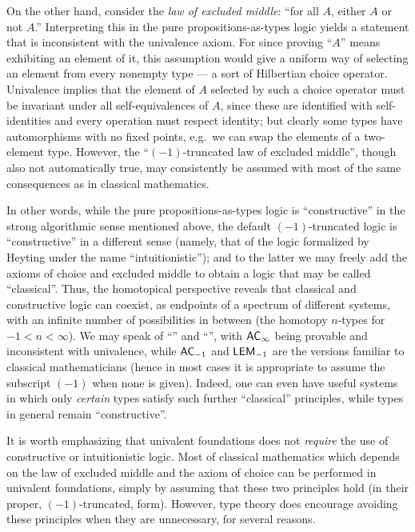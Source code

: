 %
%
On the other hand, consider the \emph{law of excluded middle}: ``for all $A$, either $A$ or not $A$.''
Interpreting this in the pure propositions-as-types logic yields a statement that is inconsistent with the univalence axiom.
For since proving ``$A$'' means exhibiting an element of it, this assumption would give a uniform way of selecting an element from every nonempty type --- a sort of Hilbertian choice operator.
Univalence implies that the element of $A$ selected by such a choice operator must be invariant under all self-equivalences of $A$, since these are identified with self-identities and every operation must respect identity; but clearly some types have automorphisms with no fixed points, e.g.\ we can swap the elements of a two-element type.
%
However, the ``$(-1)$-truncated law of excluded middle'', though also not automatically true, may consistently be assumed with most of the same consequences as in classical mathematics.

In other words, while the pure propositions-as-types logic is ``constructive'' in the strong algorithmic sense mentioned above, the default $(-1)$-truncated logic is ``constructive'' in a different sense (namely, that of the logic formalized by Heyting under the name ``intuitionistic''); and to the latter we may freely add the axioms of choice and excluded middle to obtain a logic that may be called ``classical''.
%
Thus, the homotopical perspective reveals that classical and constructive logic can coexist, as endpoints of a spectrum of different systems, with an infinite number of possibilities in between (the homotopy $n$-types for $-1 < n < \infty$).
We may speak of ``'' and ``'', with $\mathsf{AC}_{\infty}$ being provable and \LEM{\infty} inconsistent with univalence, while $\mathsf{AC}_{-1}$ and $\mathsf{LEM}_{-1}$ are the versions familiar to classical mathematicians (hence in most cases it is appropriate to assume the subscript $(-1)$ when none is given).  Indeed, one can even have useful systems in which only \emph{certain} types satisfy such further ``classical'' principles, while types in general remain ``constructive''.%

It is worth emphasizing that univalent foundations does not \emph{require} the use of constructive or intuitionistic logic. %
Most of classical mathematics which depends on the law of excluded middle and the axiom of choice can be performed in univalent foundations, simply by assuming that these two principles hold (in their proper, $(-1)$-truncated, form).
However, type theory does encourage avoiding these principles when they are unnecessary, for several reasons.


